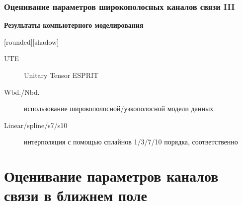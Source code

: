 \begin{frame}
	\frametitle{{\large Оценивание параметров широкополосных каналов связи III}}
	\begin{minipage}[с]{1.1\linewidth}
		\begin{center} 
			\textbf{Результаты компьютерного моделирования}
		\end{center}
	\end{minipage}
	\vfill
	{
		\footnotesize		
		[rounded][shadow]
		\begin{description}
			\item [UTE] Unitary Tensor ESPRIT \cite{Haardt08}
			\item [Wbd./Nbd.] использование широкополосной/узкополосной модели данных
			\item [Linear/spline/s7/s10] интерполяция с помощью сплайнов 1/3/7/10 порядка, соответственно
		\end{description}
	}
\end{frame}


\section{Оценивание параметров каналов связи в ближнем поле}

